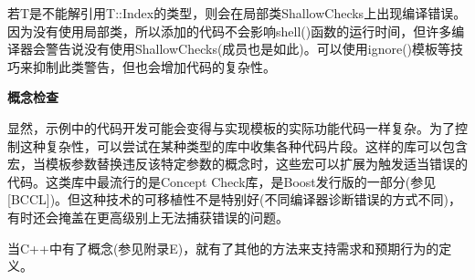 若T是不能解引用T::Index的类型，则会在局部类ShallowChecks上出现编译错误。因为没有使用局部类，所以添加的代码不会影响shell()函数的运行时间，但许多编译器会警告说没有使用ShallowChecks(成员也是如此)。可以使用ignore()模板等技巧来抑制此类警告，但也会增加代码的复杂性。

\noindent
\textbf{概念检查}

显然，示例中的代码开发可能会变得与实现模板的实际功能代码一样复杂。为了控制这种复杂性，可以尝试在某种类型的库中收集各种代码片段。这样的库可以包含宏，当模板参数替换违反该特定参数的概念时，这些宏可以扩展为触发适当错误的代码。这类库中最流行的是Concept Check库，是Boost发行版的一部分(参见[BCCL])。但这种技术的可移植性不是特别好(不同编译器诊断错误的方式不同)，有时还会掩盖在更高级别上无法捕获错误的问题。

当C++中有了概念(参见附录E)，就有了其他的方法来支持需求和预期行为的定义。






























